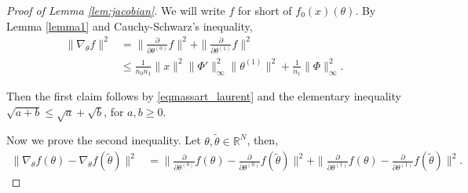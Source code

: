 \documentclass{article}
\theoremstyle{definition}
\theoremstyle{remark}
\numberwithin{equation}{section}
\newcommand{\R}{\mathbb{R}}
\newcommand{\norm}[2]{
    \|#1\|_{#2}
}
\newcommand{\partv}[1]{
    \frac{\partial}{\partial #1}
}
\begin{document}
\begin{proof}[Proof of Lemma \ref{lem:jacobian}]
    We will write $f$ for short of $f_0(x)(\theta)$.
    By Lemma \ref{lemma1} and Cauchy-Schwarz's inequality,
    \begin{align}
        \norm{\nabla_\theta f}{}^2 &= \norm{\partv{\theta^{(0)}}f}{}^2 + \norm{\partv{\theta^{(1)}}f}{}^2 \\
        &\le \frac{1}{n_0n_1}\norm{x}{}^2\norm{\Phi'}{\infty}^2\norm{\theta^{(1)}}{}^2 + \frac{1}{n_1}\norm{\Phi}{\infty}^2.
    \end{align}
    
    Then the first claim follows by \eqref{eqmassart_laurent} and the elementary inequality $\sqrt{a+b} \le \sqrt a + \sqrt b$, for $a,b\ge 0$.

    Now we prove the second inequality.
    Let $\theta, \tilde \theta \in \R^N$, then,
    \begin{align}
        \norm{\nabla_\theta f(\theta)-\nabla_\theta f(\tilde \theta)}{}^2 &= \norm{\partv{\theta^{(0)}} f(\theta)-\partv{\theta^{(0)}} f(\tilde \theta)}{}^2 + \norm{\partv{\theta^{(1)}} f(\theta)-\partv{\theta^{(1)}} f(\tilde \theta)}{}^2.
    \end{align}
    

\end{proof}
\end{document}
